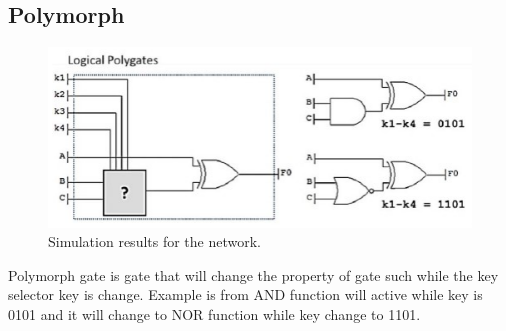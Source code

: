 \documentclass[10pt,journal,compsoc]{IEEEtran}
\begin{document}
\subsection{Polymorph}
\begin{figure}[h]
	\centering
	\includegraphics[scale=0.65]{images/polymorphgate}
	\caption{Simulation results for the network.}
	\label{fig_sim}
\end{figure}
Polymorph gate is gate that will change the property of gate such while the key selector key is change. Example is from AND function will active while key is 0101 and it will change to NOR function while key change to 1101.
\end{document}
